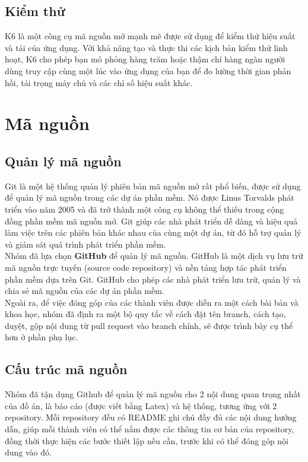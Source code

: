 \subsection{Kiểm thử}
K6 là một công cụ mã nguồn mở mạnh mẽ được sử dụng để kiểm thử hiệu suất và tải của ứng dụng. Với khả năng tạo và thực thi các kịch bản kiểm thử linh hoạt, K6 cho phép bạn mô phỏng hàng trăm hoặc thậm chí hàng ngàn người dùng truy cập cùng một lúc vào ứng dụng của bạn để đo lường thời gian phản hồi, tải trọng máy chủ và các chỉ số hiệu suất khác.
\section{Mã nguồn}
\subsection{Quản lý mã nguồn}
\noindent Git là một hệ thống quản lý phiên bản mã nguồn mở rất phổ biến, được sử dụng để quản lý mã nguồn trong các dự án phần mềm. Nó được Linus Torvalds phát triển vào năm 2005 và đã trở thành một công cụ không thể thiếu trong cộng đồng phần mềm mã nguồn mở. Git giúp các nhà phát triển dễ dàng và hiệu quả làm việc trên các phiên bản khác nhau của cùng một dự án, từ đó hỗ trợ quản lý và giám sát quá trình phát triển phần mềm. \\[0.5cm]
Nhóm đã lựa chọn \textbf{GitHub} để quản lý mã nguồn. GitHub là một dịch vụ lưu trữ mã nguồn trực tuyến (source code repository) và nền tảng hợp tác phát triển phần mềm dựa trên Git. GitHub cho phép các nhà phát triển lưu trữ, quản lý và chia sẻ mã nguồn của các dự án phần mềm.\\[0.5cm]
Ngoài ra, để việc đóng góp của các thành viên được diễn ra một cách bài bản và khoa học, nhóm đã định ra một bộ quy tắc về cách đặt tên branch, cách tạo, duyệt, gộp nội dung từ pull request vào branch chính, sẽ được trình bày cụ thể hơn ở phần phụ lục.

\subsection{Cấu trúc mã nguồn}
\noindent Nhóm đã tận dụng Github để quản lý mã nguồn cho 2 nội dung quan trọng nhất của đồ án, là báo cáo (được viết bằng Latex) và hệ thống, tương ứng với 2 repository. Mỗi repository đều có README ghi chú đầy đủ các nội dung hướng dẫn, giúp mỗi thành viên có thể nắm được các thông tin cơ bản của repository, đồng thời thực hiện các bước thiết lập nếu cần, trước khi có thể đóng góp nội dung vào đó.
